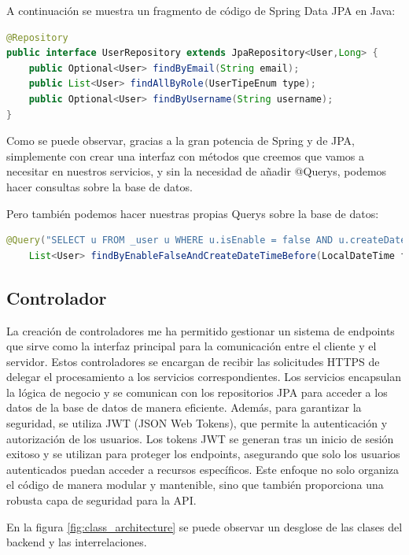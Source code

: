 A continuación se muestra un fragmento de código de Spring Data JPA en Java:
\myjavastyle
\begin{lstlisting}[language=Java, caption=Ejemplo de Repositorio en Spring Data JPA, label=lst:jpacodigo]
@Repository
public interface UserRepository extends JpaRepository<User,Long> {
    public Optional<User> findByEmail(String email);
    public List<User> findAllByRole(UserTipeEnum type);
    public Optional<User> findByUsername(String username);
}
\end{lstlisting}

Como se puede observar, gracias a la gran potencia de Spring y de JPA, simplemente con crear una interfaz con métodos que creemos que vamos a necesitar en 
nuestros servicios, y sin la necesidad de añadir @Querys, podemos hacer consultas sobre la base de datos.

Pero también podemos hacer nuestras propias Querys sobre la base de datos:
\myjavastyle
\begin{lstlisting}[language=Java, caption=Ejemplo de Query  en Spring Data JPA]
    @Query("SELECT u FROM _user u WHERE u.isEnable = false AND u.createDateTime < :fifteenMinutesAgo")
    List<User> findByEnableFalseAndCreateDateTimeBefore(LocalDateTime fifteenMinutesAgo);
\end{lstlisting}

\subsection{Controlador}
La creación de controladores me ha permitido gestionar un sistema de endpoints que sirve como la interfaz principal 
para la comunicación entre el cliente y el servidor. Estos controladores se encargan de recibir las solicitudes HTTPS de delegar el procesamiento a 
los servicios correspondientes. Los servicios encapsulan la lógica de negocio y se comunican con los repositorios JPA para acceder a los datos de la 
base de datos de manera eficiente. Además, para garantizar la seguridad, se utiliza JWT (JSON Web Tokens), que permite la autenticación y autorización 
de los usuarios. Los tokens JWT se generan tras un inicio de sesión exitoso y se utilizan para proteger los endpoints, asegurando que solo los usuarios 
autenticados puedan acceder a recursos específicos. Este enfoque no solo organiza el código de manera modular y mantenible, sino que también proporciona 
una robusta capa de seguridad para la API.

En la figura \ref{fig:class_architecture} se puede observar un desglose de las clases del backend y las interrelaciones.

